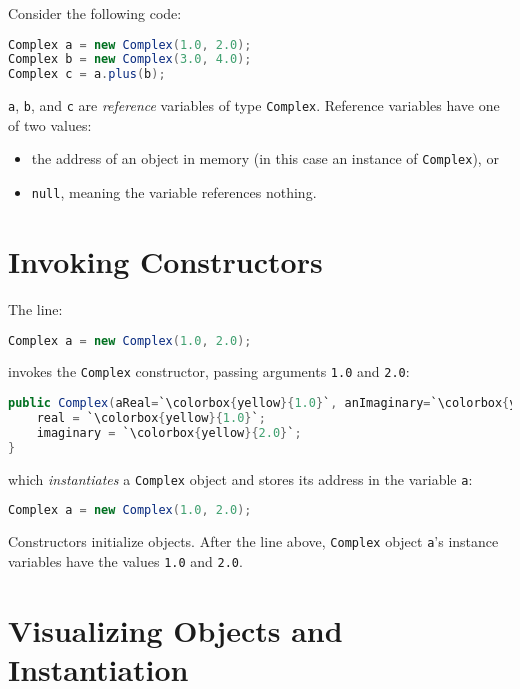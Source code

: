 \documentclass{article}
\begin{document}
Consider the following code:
\begin{lstlisting}[language=Java]
Complex a = new Complex(1.0, 2.0);
Complex b = new Complex(3.0, 4.0);
Complex c = a.plus(b);
\end{lstlisting}

{\tt a}, {\tt b}, and {\tt c} are {\it reference} variables of type {\tt Complex}.  Reference variables have one of two values:

\begin{itemize}
\item the address of an object in memory (in this case an instance of {\tt Complex}), or
\item {\tt null}, meaning the variable references nothing.
\end{itemize}





\section{Invoking Constructors}


The line:
\begin{lstlisting}[language=Java]
Complex a = new Complex(1.0, 2.0);
\end{lstlisting}

invokes the {\tt Complex} constructor, passing arguments {\tt 1.0} and {\tt 2.0}:

\begin{lstlisting}[language=Java,escapechar=`]
public Complex(aReal=`\colorbox{yellow}{1.0}`, anImaginary=`\colorbox{yellow}{2.0}`) {
    real = `\colorbox{yellow}{1.0}`;
    imaginary = `\colorbox{yellow}{2.0}`;
}
\end{lstlisting}

which {\it instantiates} a {\tt Complex} object and stores its address in the variable {\tt a}:

\begin{lstlisting}[language=Java]
Complex a = new Complex(1.0, 2.0);
\end{lstlisting}
Constructors initialize objects.  After the line above, {\tt Complex} object {\tt a}'s instance variables have the values {\tt 1.0} and {\tt 2.0}.





\section{Visualizing Objects and Instantiation}
\end{document}

